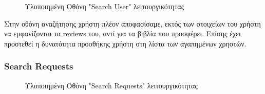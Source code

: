 \documentclass[12pt,a4paper]{article}
\begin{document}
\begin{figure}[H]
	\caption{Υλοποιημένη Οθόνη "Search User" λειτουργικότητας}
	\label{Υλοποιημένη Οθόνη "Search User" λειτουργικότητας}
\end{figure}

Στην οθόνη αναζήτησης χρήστη πλέον αποφασίσαμε, εκτός των στοιχείων του χρήστη να εμφανίζονται τα reviews του, αντί για τα βιβλία που προσφέρει. Επίσης έχει προστεθεί η δυνατότητα προσθήκης χρήστη στη λίστα των αγαπημένων χρηστών.

\subsubsection{Search Requests}

\begin{figure}[H]
	\caption{Υλοποιημένη Οθόνη "Search Requests" λειτουργικότητας}
	\label{Υλοποιημένη Οθόνη "Search Requests" λειτουργικότητας}
\end{figure}
\end{document}
